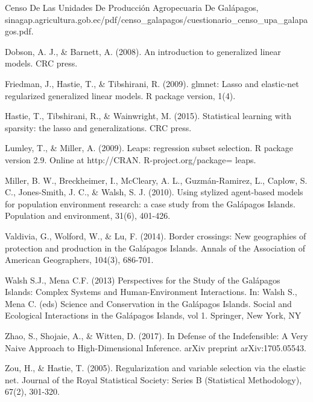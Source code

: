 \documentclass{article}
\begin{document}
\begin{thebibliography}{99}

 Censo De Las Unidades De Producci\'on Agropecuaria De Gal\'apagos, sinagap.agricultura.gob.ec/pdf/censo\_galapagos/cuestionario\_censo\_upa\_galapagos.pdf.

 Dobson, A. J., \& Barnett, A. (2008). An introduction to generalized linear models. CRC press.

 Friedman, J., Hastie, T., \& Tibshirani, R. (2009). glmnet: Lasso and elastic-net regularized generalized linear models. R package version, 1(4).

 Hastie, T., Tibshirani, R., \& Wainwright, M. (2015). Statistical learning with sparsity: the lasso and 
generalizations. CRC press.

 Lumley, T., \& Miller, A. (2009). Leaps: regression subset selection. R package version 2.9. Online at http://CRAN. R-project.org/package= leaps.

 Miller, B. W., Breckheimer, I., McCleary, A. L., Guzm\'an-Ramirez, L., Caplow, S. C., Jones-Smith, J. C., \& Walsh, S. J. (2010). Using stylized agent-based models for population environment research: a case study from the Gal\'apagos Islands. Population and environment, 31(6), 401-426.

Valdivia, G., Wolford, W., \& Lu, F. (2014). Border crossings: New geographies of protection and production in the Gal\'apagos Islands. Annals of the Association of American Geographers, 104(3), 686-701.

 Walsh S.J., Mena C.F. (2013) Perspectives for the Study of the Gal\'apagos Islands: Complex Systems and Human-Environment Interactions. In: Walsh S., Mena C. (eds) Science and Conservation in the Gal\'apagos Islands. Social and Ecological Interactions in the Gal\'apagos Islands, vol 1. Springer, New York, NY

 Zhao, S., Shojaie, A., \& Witten, D. (2017). In Defense of the Indefensible: A Very Naive Approach to High-Dimensional Inference. arXiv preprint arXiv:1705.05543.

 Zou, H., \& Hastie, T. (2005). Regularization and variable selection via the elastic net. Journal of the Royal Statistical Society: Series B (Statistical Methodology), 67(2), 301-320.




\end{thebibliography}
\end{document}
